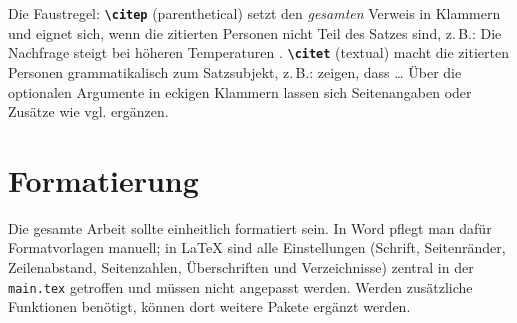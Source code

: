 \noindent Die Faustregel: \textbf{\texttt{\textbackslash citep}} (\glqq{}parenthetical\grqq{}) setzt den \emph{gesamten} Verweis in Klammern und eignet sich, wenn die zitierten Personen nicht Teil des Satzes sind, z.\,B.: \glqq{}Die Nachfrage steigt bei höheren Temperaturen \citep{kliewer2006time}.\grqq{} \textbf{\texttt{\textbackslash citet}} (\glqq{}textual\grqq{}) macht die zitierten Personen grammatikalisch zum Satzsubjekt, z.\,B.: \glqq{}\citet{kliewer2006time} zeigen, dass \dots\grqq{} Über die optionalen Argumente in eckigen Klammern lassen sich Seitenangaben oder Zusätze wie \glqq{}vgl.\grqq{} ergänzen.

\section{Formatierung}

Die gesamte Arbeit sollte einheitlich formatiert sein. In Word pflegt man dafür Formatvorlagen manuell; in LaTeX sind alle Einstellungen (Schrift, Seitenränder, Zeilenabstand, Seitenzahlen, Überschriften und Verzeichnisse) zentral in der \texttt{main.tex} getroffen und müssen nicht angepasst werden. Werden zusätzliche Funktionen benötigt, können dort weitere Pakete ergänzt werden.
